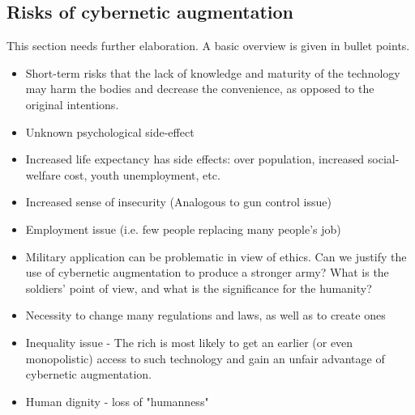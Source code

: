\subsection{Risks of cybernetic augmentation}
{\color{red} This section needs further elaboration. A basic overview is given in bullet points.}


\begin{itemize}
	\item Short-term risks that the lack of knowledge and maturity of the technology may harm the bodies and decrease the convenience, as opposed to the original intentions.
	\item Unknown psychological side-effect
	\item Increased life expectancy has side effects: over population, increased social-welfare cost, youth unemployment, etc.
	\item Increased sense of insecurity (Analogous to gun control issue)
	\item Employment issue (i.e. few people replacing many people's job)
	\item Military application can be problematic in view of ethics. Can we justify the use of cybernetic augmentation to produce a stronger army? What is the soldiers' point of view, and what is the significance for the humanity?
	\item Necessity to change many regulations and laws, as well as to create ones
	\item Inequality issue - The rich is most likely to get an earlier (or even monopolistic) access to such technology and gain an unfair advantage of cybernetic augmentation.
	\item Human dignity - loss of "humanness"
	
\end{itemize}